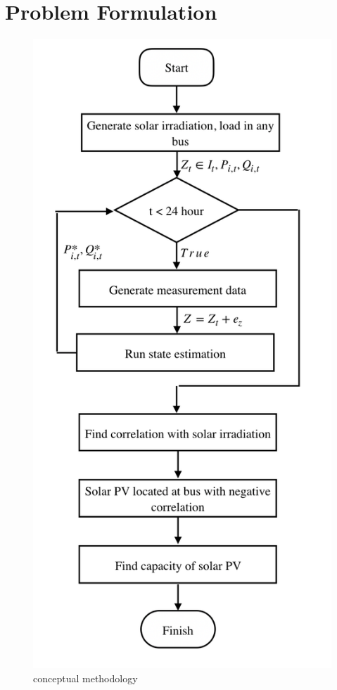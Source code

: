 \section{Problem Formulation}

\begin{figure}[h!]
  \center
  \includegraphics[scale=0.25]{images/conceptual_methodology.png}
  \caption{conceptual methodology}
  \label{fig.method}
\end{figure}

